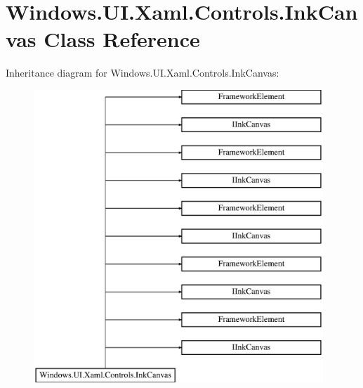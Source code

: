 \hypertarget{class_windows_1_1_u_i_1_1_xaml_1_1_controls_1_1_ink_canvas}{}\section{Windows.\+U\+I.\+Xaml.\+Controls.\+Ink\+Canvas Class Reference}
\label{class_windows_1_1_u_i_1_1_xaml_1_1_controls_1_1_ink_canvas}
Inheritance diagram for Windows.\+U\+I.\+Xaml.\+Controls.\+Ink\+Canvas\+:\begin{figure}[H]
\begin{center}
\leavevmode
\includegraphics[height=11.000000cm]{class_windows_1_1_u_i_1_1_xaml_1_1_controls_1_1_ink_canvas}
\end{center}
\end{figure}
